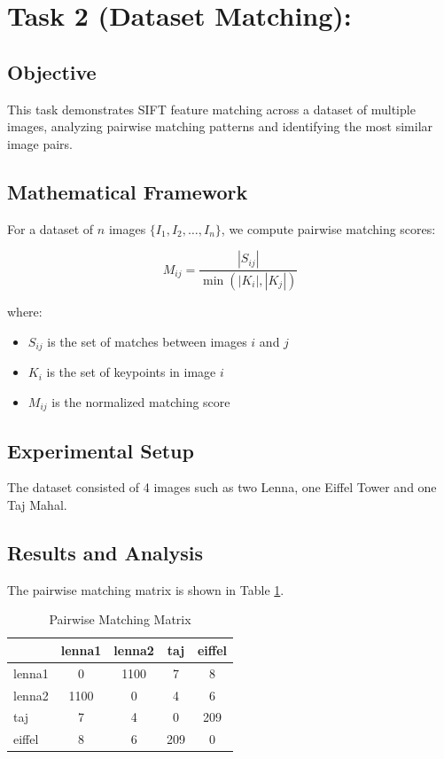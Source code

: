 \documentclass[12pt,a4paper]{article}
\begin{document}
\section{Task 2 (Dataset Matching):}

\subsection{Objective}

This task demonstrates SIFT feature matching across a dataset of multiple images, analyzing pairwise matching patterns and identifying the most similar image pairs.

\subsection{Mathematical Framework}

For a dataset of $n$ images $\{I_1, I_2, \ldots, I_n\}$, we compute pairwise matching scores:

\begin{equation}
M_{ij} = \frac{|S_{ij}|}{\min(|K_i|, |K_j|)}
\end{equation}

where:
\begin{itemize}
    \item $S_{ij}$ is the set of matches between images $i$ and $j$
    \item $K_i$ is the set of keypoints in image $i$
    \item $M_{ij}$ is the normalized matching score
\end{itemize}

\subsection{Experimental Setup}

The dataset consisted of 4 images such as two Lenna, one Eiffel Tower and one Taj Mahal.

\subsection{Results and Analysis}

The pairwise matching matrix is shown in Table \ref{tab:matching_matrix}.

\begin{table}[H]
\centering
\caption{Pairwise Matching Matrix}
\label{tab:matching_matrix}
\begin{tabular}{@{}lcccc@{}}
\toprule
 & lenna1 & lenna2 & taj & eiffel \\
\midrule
lenna1 & 0 & 1100 & 7 & 8 \\
lenna2 & 1100 & 0 & 4 & 6 \\
taj & 7 & 4 & 0 & 209 \\
eiffel & 8 & 6 & 209 & 0 \\
\bottomrule
\end{tabular}
\end{table}
\end{document}
